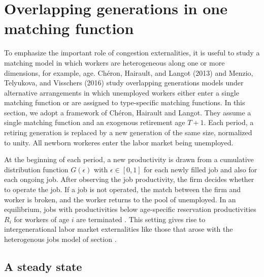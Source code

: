   
\section{Overlapping generations in one matching function}\label{sec:M_OLG1}%
  To emphasize the important role of  congestion externalities, it
  is useful to study a matching model in which workers are heterogeneous along one or more
  dimensions, for example, age.
 Ch\'eron,
Hairault, and Langot (2013) and Menzio, Telyukova, and Visschers (2016)
study overlapping generations  models under alternative arrangements in which unemployed
workers either enter a single matching function or are assigned to type-specific
matching functions. In this section,
we adopt a framework of Ch\'eron, Hairault
and Langot. They  assume a single matching function and an exogenous retirement
age $T+1$. Each period, a retiring generation is replaced by a new generation of the same
size, normalized to unity.  All newborn workeres enter the labor market being
unemployed.





At the beginning of each period, a new
productivity is drawn  from a
cumulative distribution function $G(\epsilon)$ with $\epsilon\in[0,1]$ for each newly filled job and also  for each ongoing job. After observing the job
productivity, the firm decides whether  to operate the job. If a job
is not operated, the match between the firm and worker is broken, and the
worker returns to the pool of unemployed. In an equilibrium, jobs with  productivities below
age-specific reservation productivities $R_i$ for  workers of
age $i$ are terminated . This setting gives rise to
intergenerational labor market externalities   like  those that
arose with the  heterogenous jobs model of  section .



\subsection{A steady state}

